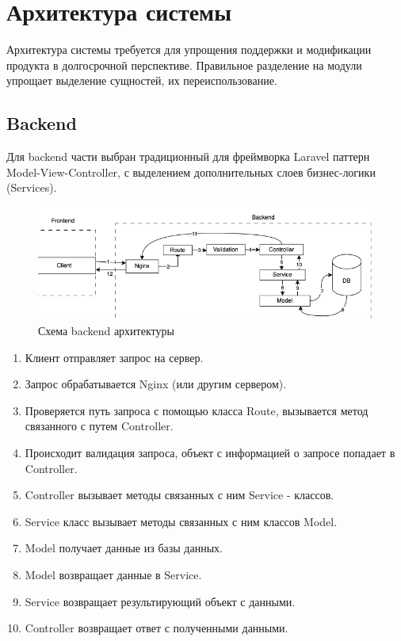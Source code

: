 \documentclass[../Отчет.tex]{subfiles}
\begin{document}
  \section{Архитектура системы}
  \par
  Архитектура системы требуется для упрощения поддержки и модификации продукта в долгосрочной перспективе. Правильное разделение на модули упрощает выделение сущностей, их переиспользование.
  \subsection{Backend}
  \par
  Для backend части выбран традиционный для фреймворка Laravel паттерн Model-View-Controller, с выделением дополнительных слоев бизнес-логики (Services).
  \begin{figure}[H]
    \includegraphics[width=\textwidth, frame]{../graphics/uml-back.png}
    \caption{Схема backend архитектуры}
    \label{pic:backarch}
  \end{figure}
  \begin{enumerate}
    \item Клиент отправляет запрос на сервер.
    \item Запрос обрабатывается Nginx (или другим сервером).
    \item Проверяется путь запроса с помощью класса Route, вызывается метод связанного с путем Controller.
    \item Происходит валидация запроса, объект с информацией о запросе попадает в Controller.
    \item Controller вызывает методы связанных с ним Service - классов.
    \item Service класс вызывает методы связанных с ним классов Model.
    \item Model получает данные из базы данных.
    \item Model возвращает данные в Service.
    \item Service возвращает результирующий объект с данными.
    \item Controller возвращает ответ с полученными данными.
  \end{enumerate}
\end{document}
